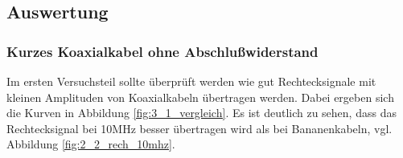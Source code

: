 \documentclass[12pt,a4paper]{article}
\begin{document}
\subsection{Auswertung}

\subsubsection{Kurzes Koaxialkabel ohne Abschlußwiderstand}
Im ersten Versuchsteil sollte überprüft werden wie gut Rechtecksignale mit kleinen Amplituden von Koaxialkabeln übertragen werden. Dabei ergeben sich die Kurven in Abbildung \ref{fig:3_1_vergleich}. Es ist deutlich zu sehen, dass das Rechtecksignal bei 10MHz besser übertragen wird als bei Bananenkabeln, vgl. Abbildung \ref{fig:2_2_rech_10mhz}.
\end{document}
